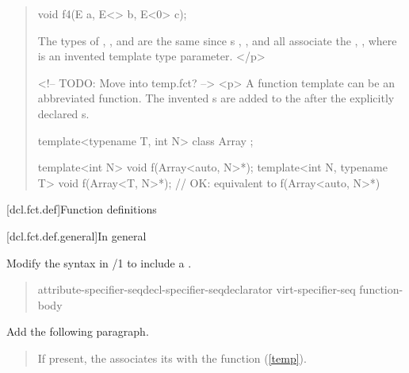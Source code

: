 \begin{quote}
\begin{codeblock}
void f4(E a, E<> b, E<0> c);
\end{codeblock}
The types of , , and  are
the same since s
, , and 
all associate the ,
, where  is an invented
template type parameter.
</p>

<!-- TODO: Move into temp.fct? -->
<p> A function template can be an abbreviated function. The
invented s are
added to the 
after the explicitly declared s.

\enterexample
\begin{codeblock}
template<typename T, int N> class Array { };

template<int N> void f(Array<auto, N>*);
template<int N, typename T> void f(Array<T, N>*); // OK: equivalent to f(Array<auto, N>*)
\end{codeblock}
\exitexample
\end{quote}

\setcounter{section}{3}
[dcl.fct.def]{Function definitions}


[dcl.fct.def.general]{In general}

Modify the 
syntax in /1
to include a .

\begin{quote}
\pnum
\begin{bnf}
\br
    attribute-specifier-seq\opt decl-specifier-seq\opt declarator virt-specifier-seq\opt {} function-body
\end{bnf}
\end{quote}

Add the following paragraph.

\begin{quote}
\begin{addedblock}
\setcounter{Paras}{8}
If present, the 
associates its 
with the function (\ref{temp}).
\end{addedblock}
\end{quote}
